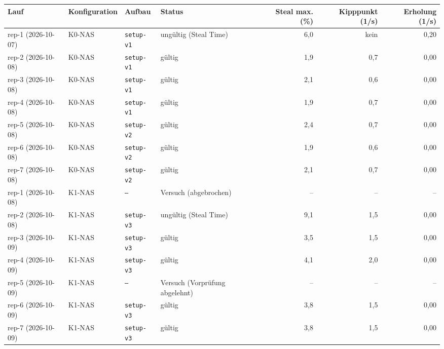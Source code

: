\begin{tabular}{llllrrr}
\toprule
Lauf & Konfiguration & Aufbau & Status & Steal max. (\%) & Kipppunkt (1/s) & Erholung (1/s) \\
\midrule
rep-1 (2026-10-07) & K0-NAS & \texttt{setup-v1} & ungültig (Steal Time) & 6,0 & kein & 0,20 \\
rep-2 (2026-10-08) & K0-NAS & \texttt{setup-v1} & gültig & 1,9 & 0,7 & 0,00 \\
rep-3 (2026-10-08) & K0-NAS & \texttt{setup-v1} & gültig & 2,1 & 0,6 & 0,00 \\
rep-4 (2026-10-08) & K0-NAS & \texttt{setup-v1} & gültig & 1,9 & 0,7 & 0,00 \\
rep-5 (2026-10-08) & K0-NAS & \texttt{setup-v2} & gültig & 2,4 & 0,7 & 0,00 \\
rep-6 (2026-10-08) & K0-NAS & \texttt{setup-v2} & gültig & 1,9 & 0,6 & 0,00 \\
rep-7 (2026-10-08) & K0-NAS & \texttt{setup-v2} & gültig & 2,1 & 0,7 & 0,00 \\
rep-1 (2026-10-08) & K1-NAS & \texttt{–} & Versuch (abgebrochen) & – & – & – \\
rep-2 (2026-10-08) & K1-NAS & \texttt{setup-v3} & ungültig (Steal Time) & 9,1 & 1,5 & 0,00 \\
rep-3 (2026-10-09) & K1-NAS & \texttt{setup-v3} & gültig & 3,5 & 1,5 & 0,00 \\
rep-4 (2026-10-09) & K1-NAS & \texttt{setup-v3} & gültig & 4,1 & 2,0 & 0,00 \\
rep-5 (2026-10-09) & K1-NAS & \texttt{–} & Versuch (Vorprüfung abgelehnt) & – & – & – \\
rep-6 (2026-10-09) & K1-NAS & \texttt{setup-v3} & gültig & 3,8 & 1,5 & 0,00 \\
rep-7 (2026-10-09) & K1-NAS & \texttt{setup-v3} & gültig & 3,8 & 1,5 & 0,00 \\
\bottomrule
\end{tabular}
